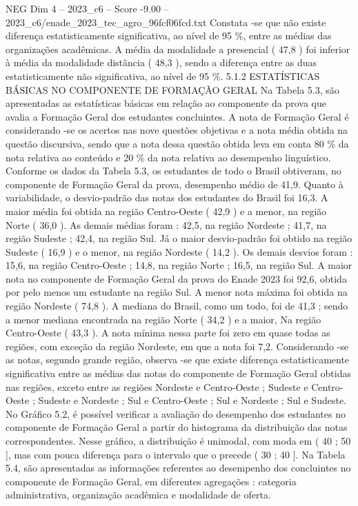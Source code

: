 \begin{textsample}{NEG Dim 4 – 2023\_c6 – Score -9.00 – 2023\_c6/enade\_2023\_tec\_agro\_96fcf06fcd.txt}
Constata -se que não existe diferença estatisticamente significativa, ao nível de 95 \%, entre as médias das organizações acadêmicas.
A média da modalidade a presencial ( 47,8 ) foi inferior à média da modalidade distância ( 48,3 ), sendo a diferença entre as duas estatisticamente não significativa, ao nível de 95 \%. 5.1.2 ESTATÍSTICAS BÁSICAS NO COMPONENTE DE FORMAÇÃO GERAL Na Tabela 5.3, são apresentadas as estatísticas básicas em relação ao componente da prova que avalia a Formação Geral dos estudantes concluintes.
A nota de Formação Geral é considerando -se os acertos nas nove questões objetivas e a nota média obtida na questão discursiva, sendo que a nota dessa questão obtida leva em conta 80 \% da nota relativa ao conteúdo e 20 \% da nota relativa ao desempenho linguístico.
Conforme os dados da Tabela 5.3, os estudantes de todo o Brasil obtiveram, no componente de Formação Geral da prova, desempenho médio de 41,9.
Quanto à variabilidade, o desvio-padrão das notas dos estudantes do Brasil foi 16,3.
A maior média foi obtida na região Centro-Oeste ( 42,9 ) e a menor, na região Norte ( 36,0 ).
As demais médias foram : 42,5, na região Nordeste ; 41,7, na região Sudeste ; 42,4, na região Sul.
Já o maior desvio-padrão foi obtido na região Sudeste ( 16,9 ) e o menor, na região Nordeste ( 14,2 ).
Os demais desvios foram : 15,6, na região Centro-Oeste ; 14,8, na região Norte ; 16,5, na região Sul.
A maior nota no componente de Formação Geral da prova do Enade 2023 foi 92,6, obtida por pelo menos um estudante na região Sul.
A menor nota máxima foi obtida na região Nordeste ( 74,8 ).
A mediana do Brasil, como um todo, foi de 41,3 ; sendo a menor mediana encontrada na região Norte ( 34,2 ) e a maior, Na região Centro-Oeste ( 43,3 ).
A nota mínima nessa parte foi zero em quase todas as regiões, com exceção da região Nordeste, em que a nota foi 7,2.
Considerando -se as notas, segundo grande região, observa -se que existe diferença estatisticamente significativa entre as médias das notas do componente de Formação Geral obtidas nas regiões, exceto entre as regiões Nordeste e Centro-Oeste ; Sudeste e Centro-Oeste ; Sudeste e Nordeste ; Sul e Centro-Oeste ; Sul e Nordeste ; Sul e Sudeste.
No Gráfico 5.2, é possível verificar a avaliação do desempenho dos estudantes no componente de Formação Geral a partir do histograma da distribuição das notas correspondentes.
Nesse gráfico, a distribuição é unimodal, com moda em ( 40 ; 50 ], mas com pouca diferença para o intervalo que o precede ( 30 ; 40 ].
Na Tabela 5.4, são apresentadas as informações referentes ao desempenho dos concluintes no componente de Formação Geral, em diferentes agregações : categoria administrativa, organização acadêmica e modalidade de oferta.

\end{textsample}
